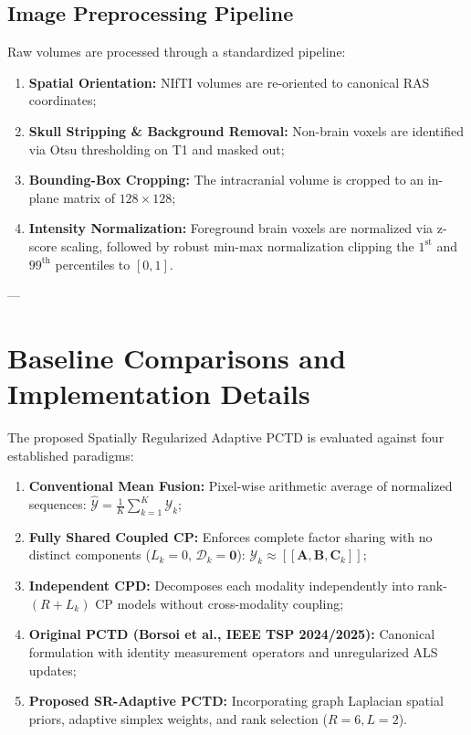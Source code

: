 \documentclass[11pt,a4paper]{article}
\begin{document}
\subsection{Image Preprocessing Pipeline}
Raw volumes are processed through a standardized pipeline:
\begin{enumerate}
    \item \textbf{Spatial Orientation:} NIfTI volumes are re-oriented to canonical RAS coordinates;
    \item \textbf{Skull Stripping \& Background Removal:} Non-brain voxels are identified via Otsu thresholding on T1 and masked out;
    \item \textbf{Bounding-Box Cropping:} The intracranial volume is cropped to an in-plane matrix of $128 \times 128$;
    \item \textbf{Intensity Normalization:} Foreground brain voxels are normalized via z-score scaling, followed by robust min-max normalization clipping the $1^{\text{st}}$ and $99^{\text{th}}$ percentiles to $[0, 1]$.
\end{enumerate}

---

\section{Baseline Comparisons and Implementation Details}
\label{sec:baselines}

The proposed Spatially Regularized Adaptive PCTD is evaluated against four established paradigms:
\begin{enumerate}[label=(\Alph*)]
    \item \textbf{Conventional Mean Fusion:} Pixel-wise arithmetic average of normalized sequences: $\hat{\bm{\mathcal{Y}}} = \frac{1}{K} \sum_{k=1}^K \bm{\mathcal{Y}}_k$;
    \item \textbf{Fully Shared Coupled CP:} Enforces complete factor sharing with no distinct components ($L_k = 0$, $\bm{\mathcal{D}}_k = \mathbf{0}$): $\bm{\mathcal{Y}}_k \approx [\![\mathbf{A}, \mathbf{B}, \mathbf{C}_k]\!]$;
    \item \textbf{Independent CPD:} Decomposes each modality independently into rank-$(R+L_k)$ CP models without cross-modality coupling;
    \item \textbf{Original PCTD (Borsoi et al., IEEE TSP 2024/2025):} Canonical formulation with identity measurement operators and unregularized ALS updates;
    \item \textbf{Proposed SR-Adaptive PCTD:} Incorporating graph Laplacian spatial priors, adaptive simplex weights, and rank selection ($R=6, L=2$).
\end{enumerate}
\end{document}
